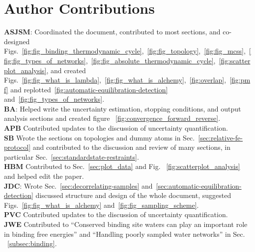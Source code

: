 \documentclass[9pt,bestpractices]{livecoms}
\begin{document}
\section*{Author Contributions}
%
\textbf{ASJSM}: Coordinated the document, contributed to most sections, and co-designed Figs.~\ref{fig:fig_binding_thermodynamic_cycle},~\ref{fig:fig_topology},~\ref{fig:fig_mcss},~\ref{fig:fig_types_of_networks},~\ref{fig:fig_absolute_thermodynamic_cycle},~\ref{fig:scatterplot_analysis}, and created Figs.~\ref{fig:fig_what_is_lambda},~\ref{fig:fig_what_is_alchemy},~\ref{fig:overlap},~\ref{fig:pmf} and replotted~\ref{fig:automatic-equilibration-detection} and~\ref{fig:fig_types_of_networks}.\\
\textbf{BA}: Helped write the uncertainty estimation, stopping conditions, and output analysis sections and created figure ~\ref{fig:convergence_forward_reverse}.\\
\textbf{APB} Contributed updates to the discussion of uncertainty quantification.\\
\textbf{SB} Wrote the sections on topologies and dummy atoms in Sec.~\ref{sec:relative-fe-protocol} and contributed to the discussion and review of many sections, in particular Sec.~\ref{sec:standardstate-restraints}.\\
\textbf{HBM} Contributed to Sec.~\ref{sec:plot_data} and Fig.~ \ref{fig:scatterplot_analysis} and helped edit the paper.\\
\textbf{JDC}: Wrote Sec.~\ref{sec:decorrelating-samples} and~\ref{sec:automatic-equilibration-detection} discussed structure and design of the whole document, suggested Figs.~\ref{fig:fig_what_is_alchemy} and~\ref{fig:fig_sampling_scheme}. \\
\textbf{PVC} Contributed updates to the discussion of uncertainty quantification.\\
\textbf{JWE} Contributed to ``Conserved binding site waters can play an important role in binding free energies'' and ``Handling poorly sampled water networks'' in Sec. ~\ref{subsec:binding}.\\
\end{document}
